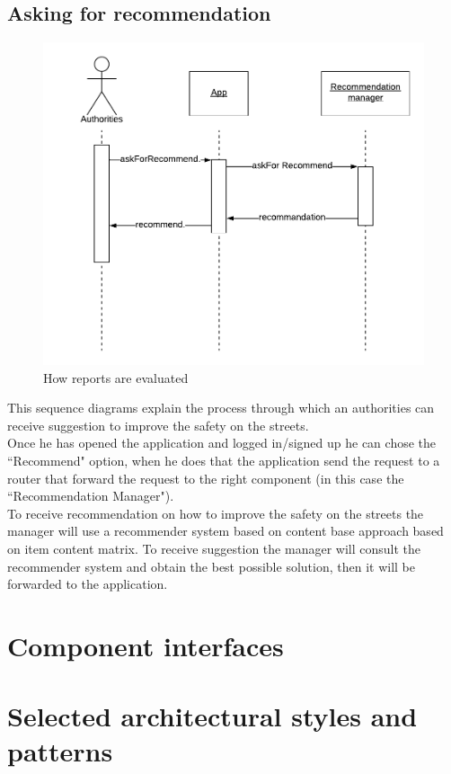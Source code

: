 \documentclass[12pt,a4paper]{report}
\begin{document}
			\subsection{Asking for recommendation}
				\begin{figure}[H]
						\includegraphics[width = \textwidth, center]{recommendation}
						\caption{How reports are evaluated}
						\label{fig: diagrams}
				\end{figure}
				This sequence diagrams explain the process through which an authorities can receive suggestion to improve
				the safety on the streets.\\
				Once he has opened the application and logged in/signed up he can chose the ``Recommend" option,
				when he does that the application send the request to a router that forward the request to the right
				component (in this case the ``Recommendation Manager").\\
				To receive recommendation on how to improve the safety on the streets the manager will use a recommender
				system based on content base approach based on item content matrix. To receive suggestion the manager
				will consult the recommender system and obtain the best possible solution, then it will be forwarded to the
				application.
		\section{Component interfaces}
		\section{Selected architectural styles and patterns}
\end{document}
